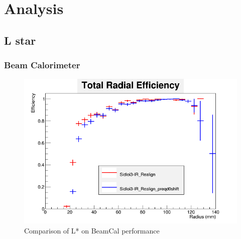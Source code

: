 \documentclass{report}
\begin{document}
    \chapter{Analysis}
        \section{L star}
            \subsection{Beam Calorimeter}
                \begin{figure}[H] 
                    \includegraphics[width=\textwidth]{RadialEfficiencyFP_total}
                    \centering
                    \caption{Comparison of L* on BeamCal performance}
                    \label{lstar_beamcal_total}
                \end{figure}
\end{document}
